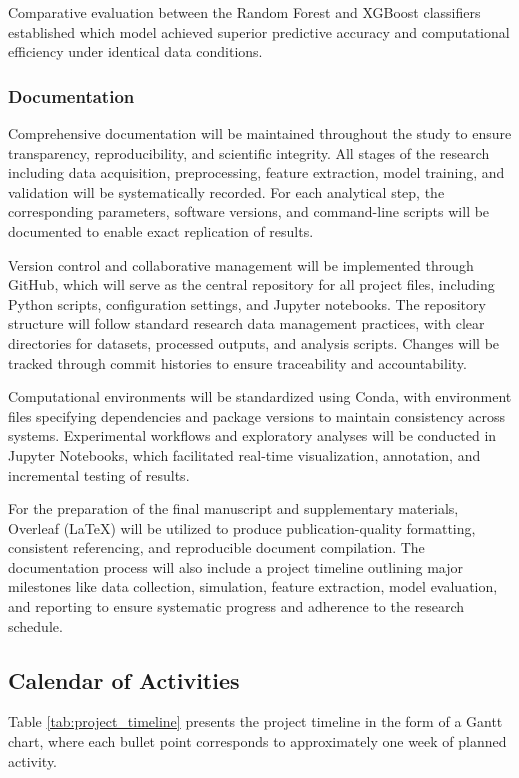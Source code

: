 Comparative evaluation between the Random Forest and XGBoost classifiers established which model achieved superior predictive accuracy and computational efficiency under identical data conditions.

\subsubsection{Documentation} 
Comprehensive documentation will be maintained throughout the study to ensure transparency, reproducibility, and scientific integrity. All stages of the research including data acquisition, preprocessing, feature extraction, model training, and validation will be systematically recorded. For each analytical step, the corresponding parameters, software versions, and command-line scripts will be documented to enable exact replication of results.

Version control and collaborative management will be implemented through GitHub, which will serve as the central repository for all project files, including Python scripts, configuration settings, and Jupyter notebooks. The repository structure will follow standard research data management practices, with clear directories for datasets, processed outputs, and analysis scripts. Changes will be tracked through commit histories to ensure traceability and accountability. 

Computational environments will be standardized using Conda, with environment files specifying dependencies and package versions to maintain consistency across systems. Experimental workflows and exploratory analyses will be conducted in Jupyter Notebooks,  which facilitated real-time visualization, annotation, and incremental testing of results.

For the preparation of the final manuscript and supplementary materials, Overleaf (LaTeX) will be utilized to produce publication-quality formatting, consistent referencing, and reproducible document compilation. The documentation process will also include a project timeline outlining major milestones like data collection, simulation, feature extraction, model evaluation, and reporting to ensure systematic progress and adherence to the research schedule.

 \subsection{Calendar of Activities} 
 Table \ref{tab:project_timeline} presents the project timeline in the form of a Gantt chart, where each bullet point corresponds to approximately one week of planned activity.

